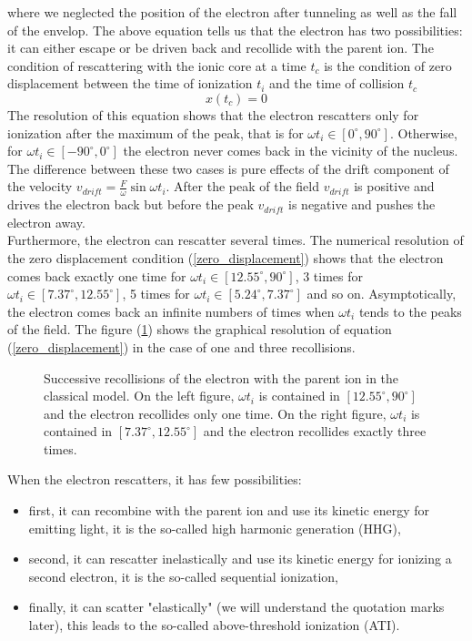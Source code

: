 \documentclass[a4paper]{article}
\begin{document}
where we neglected the position of the electron after tunneling as well as the fall of the envelop.
The above equation tells us that the electron has two possibilities: it can either escape or be driven back and recollide with the parent ion. The condition of rescattering with the ionic core at a time $t_{c}$ is the condition of zero displacement between the time of ionization $t_{i}$ and the time of collision $t_{c}$
\begin{equation}
\label{zero_displacement}
x(t_{c})=0 
\end{equation}
The resolution of this equation shows that the electron rescatters only for ionization after the maximum of the peak, that is for $\omega t_{i} \in [0^{\circ},90^{\circ}]$. Otherwise, for $\omega t_{i} \in [-90^{\circ},0^{\circ}]$ the electron never comes back in the vicinity of the nucleus. The difference between these two cases is pure effects of the drift component of the velocity $v_{drift}=\frac{F}{\omega}\sin{\omega t_{i}}$. After the peak  of the field $v_{drift}$ is positive and drives the electron back but before the peak $v_{drift}$ is negative and pushes the electron away. \\
Furthermore, the electron can rescatter several times. The numerical resolution of the zero displacement condition (\ref{zero_displacement}) shows that the electron comes back exactly one time for $\omega t_{i} \in [12.55^{\circ},90^{\circ}]$, 3 times for $\omega t_{i} \in [7.37^{\circ},12.55^{\circ}]$, 5 times for $\omega t_{i} \in [5.24^{\circ},7.37^{\circ}]$ and so on. Asymptotically, the electron comes back an infinite numbers of times when $\omega t_{i}$ tends to the peaks of the field. The figure (\ref{successive_recollision}) shows the graphical resolution of equation (\ref{zero_displacement}) in the case of one and three recollisions.
\begin{figure}
\centering
 
 \caption{Successive recollisions of the electron with the parent ion in the classical model. On the left figure, $\omega t_{i}$ is contained in $[12.55^{\circ},90^{\circ}]$ and the electron recollides only one time. On the right figure, $\omega t_{i}$ is contained in $[7.37^{\circ},12.55^{\circ}]$ and the electron recollides exactly three times.}
 \label{successive_recollision} 
\end{figure}
\par 
When the electron rescatters, it has few possibilities:
\begin{itemize}
\item
first, it can recombine with the parent ion and use its kinetic energy for emitting light, it is the so-called high harmonic generation (HHG),
\item
second, it can rescatter inelastically and use its kinetic energy for ionizing a second electron, it is the so-called sequential ionization,
\item
finally, it can scatter "elastically" (we will understand the quotation marks later), this leads to the so-called above-threshold ionization (ATI).
\end{itemize}
\end{document}
